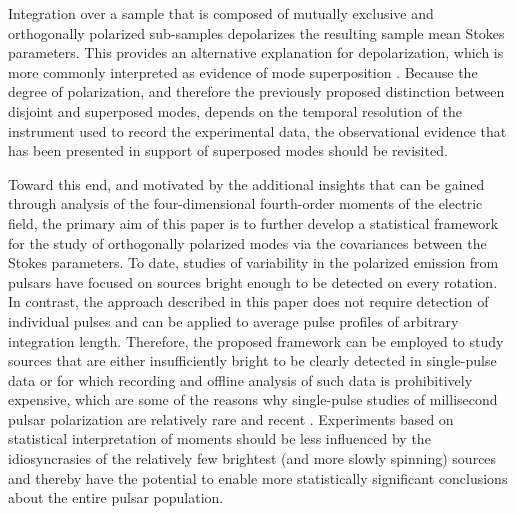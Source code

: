 \documentclass[twocolumn]{aastex6}
\begin{document}
Integration over a sample that is composed of mutually exclusive and
orthogonally polarized sub-samples depolarizes the resulting sample
mean Stokes parameters. This provides an alternative explanation for
depolarization, which is more commonly interpreted as evidence of mode
superposition \citep[e.g.][]{scr+84,ms98,krj+11}.
%
Because the degree of polarization, and therefore the previously
proposed distinction between disjoint and superposed modes, depends
on the temporal resolution of the instrument used to record the
experimental data, the observational evidence that has been presented
in support of superposed modes should be revisited.


Toward this end, and motivated by the additional insights that can be
gained through analysis of the four-dimensional fourth-order moments
of the electric field, the primary aim of this paper is to further
develop a statistical framework for the study of orthogonally
polarized modes via the covariances between the Stokes parameters.
%
To date, studies of variability in the polarized emission from pulsars
have focused on sources bright enough to be detected on every
rotation.
%
In contrast, the approach described in this paper does not require
detection of individual pulses and can be applied to average pulse
profiles of arbitrary integration length.
%
Therefore, the proposed framework can be employed to study sources
that are either insufficiently bright to be clearly detected in
single-pulse data or for which recording and offline analysis of such
data is prohibitively expensive, which are some of the reasons why
single-pulse studies of millisecond pulsar polarization are relatively
rare and recent \citep[e.g.][]{ovb+14,lkl+15}.
%
Experiments based on statistical interpretation of moments should be
less influenced by the idiosyncrasies of the relatively few brightest
(and more slowly spinning) sources and thereby have the potential to
enable more statistically significant conclusions about the entire
pulsar population.
\end{document}
